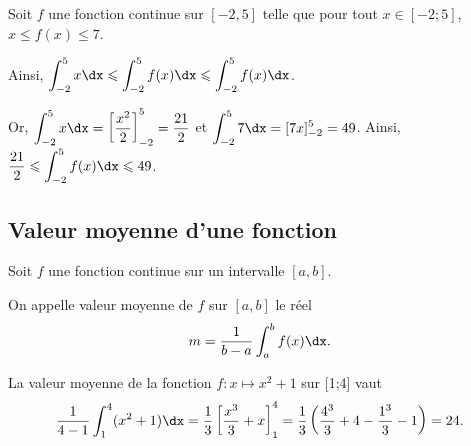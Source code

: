 \documentclass[11pt,fleqn, openany]{book} %
\begin{document}
\begin{example}Soit $f$ une fonction continue sur $[-2,5]$ telle que pour tout $x\in [-2;5]$, $x\leqslant f(x) \leqslant 7$.

Ainsi, $\displaystyle\int_{-2}^5 x\dx \leqslant \displaystyle\int_{-2}^5 f(x)\dx \leqslant \displaystyle\int_{-2}^5 f(x)\dx$.

Or, $\displaystyle\int_{-2}^5 x\dx = \left[\dfrac{x^2}{2}\right]_{-2}^5=\dfrac{21}{2}$ et $\displaystyle\int_{-2}^5 7\dx=[7x]_{-2}^5=49$. Ainsi, $\dfrac{21}{2}\leqslant \displaystyle\int_{-2}^5 f(x)\dx \leqslant 49$.
\end{example}

\subsection{Valeur moyenne d'une fonction}

\begin{definition} Soit $f$ une fonction continue sur un intervalle $[a,b]$.

On appelle valeur moyenne de $f$ sur $[a,b]$ le réel \[m=\dfrac{1}{b-a}\displaystyle\int_{a}^b f(x)\dx.\]\end{definition}

\begin{example}La valeur moyenne de la fonction $f:x\mapsto x^2+1$ sur [1;4] vaut
\[ \dfrac{1}{4-1} \int_{1}^4 (x^2+1)\dx = \dfrac{1}{3}\left[ \dfrac{x^3}{3}+x\right]^4_1=\dfrac{1}{3}\left(\dfrac{4^3}{3}+4-\dfrac{1^3}{3}-1\right)=24.\]\vspace{-0.5cm}\end{example}
\end{document}
